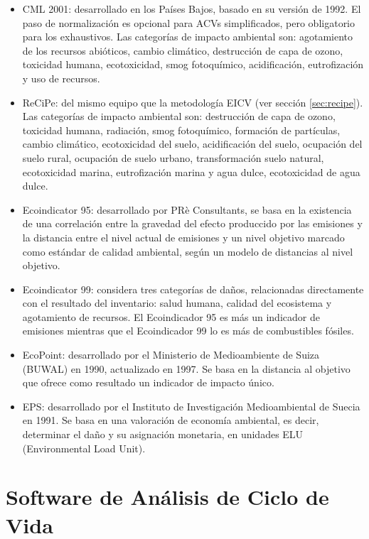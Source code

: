\begin{itemize}
  \item CML 2001: desarrollado en los Países Bajos, basado en su versión de 1992. El paso de normalización es opcional para ACVs simplificados, pero obligatorio para los exhaustivos. Las categorías de impacto ambiental son: agotamiento de los recursos abióticos, cambio climático, destrucción de capa de ozono, toxicidad humana, ecotoxicidad, smog fotoquímico, acidificación, eutrofización y uso de recursos.
  \item ReCiPe: del mismo equipo que la metodología EICV (ver sección \ref{sec:recipe}). Las categorías de impacto ambiental son: destrucción de capa de ozono, toxicidad humana, radiación, smog fotoquímico, formación de partículas, cambio climático, ecotoxicidad del suelo, acidificación del suelo, ocupación del suelo rural, ocupación de suelo urbano, transformación suelo natural, ecotoxicidad marina, eutrofización marina y agua dulce, ecotoxicidad de agua dulce.
  \item Ecoindicator 95: desarrollado por PRè Consultants, se basa en la existencia de una correlación entre la gravedad del efecto produccido por las emisiones y la distancia entre el nivel actual de emisiones y un nivel objetivo marcado como estándar de calidad ambiental, según un modelo de distancias al nivel objetivo.
  \item Ecoindicator 99: considera tres categorías de daños, relacionadas directamente con el resultado del inventario: salud humana, calidad del ecosistema y agotamiento de recursos. El Ecoindicador 95 es más un indicador de emisiones mientras que el Ecoindicador 99 lo es más de combustibles fósiles.
  \item EcoPoint: desarrollado por el Ministerio de Medioambiente de Suiza (BUWAL) en 1990, actualizado en 1997. Se basa en la distancia al objetivo que ofrece como resultado un indicador de impacto único.
  \item EPS: desarrollado por el Instituto de Investigación Medioambiental de Suecia en 1991. Se basa en una valoración de economía ambiental, es decir, determinar el daño y su asignación monetaria, en unidades ELU (Environmental Load Unit).
\end{itemize}

\section{Software de Análisis de Ciclo de Vida}\label{sec:software}

